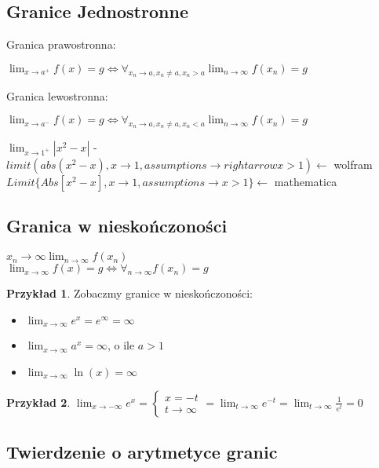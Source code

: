 \documentclass{article}
\theoremstyle{definition}
\theoremstyle{definition}
\theoremstyle{definition}
\newtheorem{pk}{Przykład}[subsection]
\theoremstyle{definition}
\begin{document}
\subsection{Granice Jednostronne}

Granica prawostronna:
\begin{center}
    $\lim_{x\rightarrow a^{+}} f(x)=g \iff \forall_{x_n\rightarrow a, x_n\neq a, x_n>a} \lim_{n\rightarrow \infty} f(x_n)=g$
\end{center}
Granica lewostronna:
\begin{center}
    $\lim_{x\rightarrow a^{-}} f(x)=g \iff \forall_{x_n\rightarrow a, x_n\neq a, x_n<a} \lim_{n\rightarrow \infty} f(x_n)=g$
\end{center}
$\lim_{x\rightarrow 1^{+}} |x^2-x|$ - $limit(abs(x^2-x),x\rightarrow 1,assumptions\rightarrow rightarrow x>1)\leftarrow$ wolfram\\
$Limit\{Abs[x^2-x],x\rightarrow 1, assumptions\rightarrow x>1\}\leftarrow$ mathematica

\subsection{Granica w nieskończoności}

$x_n\rightarrow \infty \lim_{n\rightarrow \infty} f(x_n)$\\
$\lim_{x\rightarrow \infty} f(x)=g \iff \forall_{n\rightarrow \infty} f(x_n)=g$

\begin{pk}
    Zobaczmy granice w nieskończoności:
    \begin{itemize}
        \item $\lim_{x\rightarrow \infty} e^x = e^{\infty} = \infty$
        \item $\lim_{x\rightarrow \infty} a^x = \infty$, o ile $a>1$
        \item $\lim_{x\rightarrow \infty} \ln(x) = \infty$
    \end{itemize}
\end{pk}

\begin{pk}
    $\lim_{x\rightarrow -\infty} e^x = \begin{cases}
        x=-t\\
        t\rightarrow \infty
    \end{cases}=
    \lim_{t\rightarrow \infty} e^{-t} = \lim_{t\rightarrow \infty} \frac{1}{e^t} = 0
    $
\end{pk}

\subsection{Twierdzenie o arytmetyce granic}
\end{document}
